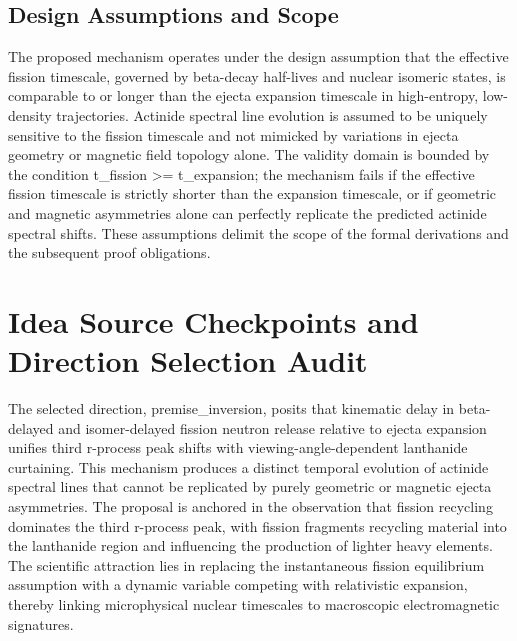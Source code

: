 \documentclass[conference]{IEEEtran}
\begin{document}
\subsection{Design Assumptions and Scope}
The proposed mechanism operates under the design assumption that the effective fission timescale, governed by beta-decay half-lives and nuclear isomeric states, is comparable to or longer than the ejecta expansion timescale in high-entropy, low-density trajectories. Actinide spectral line evolution is assumed to be uniquely sensitive to the fission timescale and not mimicked by variations in ejecta geometry or magnetic field topology alone. The validity domain is bounded by the condition t\_fission >= t\_expansion; the mechanism fails if the effective fission timescale is strictly shorter than the expansion timescale, or if geometric and magnetic asymmetries alone can perfectly replicate the predicted actinide spectral shifts. These assumptions delimit the scope of the formal derivations and the subsequent proof obligations.

\section{Idea Source Checkpoints and Direction Selection Audit}
The selected direction, premise\_inversion, posits that kinematic delay in beta-delayed and isomer-delayed fission neutron release relative to ejecta expansion unifies third r-process peak shifts with viewing-angle-dependent lanthanide curtaining. This mechanism produces a distinct temporal evolution of actinide spectral lines that cannot be replicated by purely geometric or magnetic ejecta asymmetries. The proposal is anchored in the observation that fission recycling dominates the third r-process peak, with fission fragments recycling material into the lanthanide region and influencing the production of lighter heavy elements. The scientific attraction lies in replacing the instantaneous fission equilibrium assumption with a dynamic variable competing with relativistic expansion, thereby linking microphysical nuclear timescales to macroscopic electromagnetic signatures.~\cite{cite_30c88fe46f23448d}
\end{document}
